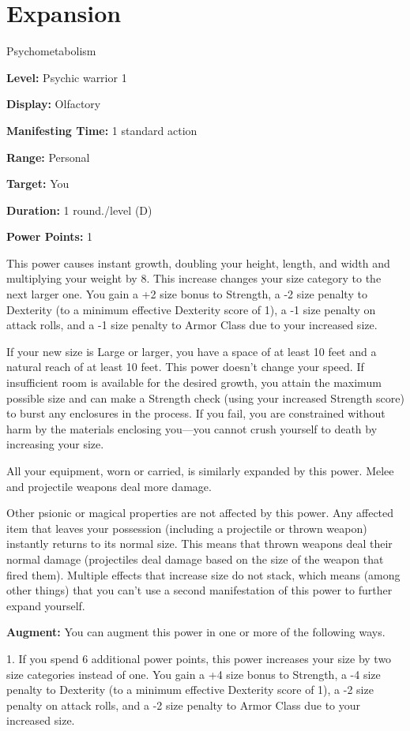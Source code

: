 \documentclass{article}
\begin{document}
\section*{Expansion}

Psychometabolism

\textbf{Level:} Psychic warrior 1

\textbf{Display:} Olfactory

\textbf{Manifesting Time:} 1 standard action

\textbf{Range:} Personal

\textbf{Target:} You

\textbf{Duration:} 1 round./level (D)

\textbf{Power Points:} 1

This power causes instant growth, doubling your height, length, and width and multiplying 
your weight by 8. This increase changes your size category to the next larger one. 
You gain a +2 size bonus to Strength, a -2 size penalty to Dexterity (to a minimum 
effective Dexterity score of 1), a -1 size penalty on attack rolls, and a -1 size 
penalty to Armor Class due to your increased size.

If your new size is Large or larger, you have a space of at least 10 feet and a 
natural reach of at least 10 feet. This power doesn't change your speed. If insufficient 
room is available for the desired growth, you attain the maximum possible size 
and can make a Strength check (using your increased Strength score) to burst any 
enclosures in the process. If you fail, you are constrained without harm by the 
materials enclosing you---you cannot crush yourself to death by increasing your 
size.

All your equipment, worn or carried, is similarly expanded by this power. Melee 
and projectile weapons deal more damage.

Other psionic or magical properties are not affected by this power. Any affected 
item that leaves your possession (including a projectile or thrown weapon) instantly 
returns to its normal size. This means that thrown weapons deal their normal damage 
(projectiles deal damage based on the size of the weapon that fired them). Multiple 
effects that increase size do not stack, which means (among other things) that 
you can't use a second manifestation of this power to further expand yourself.

\textbf{Augment:} You can augment this power in one or more of the following ways.

1. If you spend 6 additional power points, this power increases your size by two 
size categories instead of one. You gain a +4 size bonus to Strength, a -4 size 
penalty to Dexterity (to a minimum effective Dexterity score of 1), a -2 size penalty 
on attack rolls, and a -2 size penalty to Armor Class due to your increased size.
\end{document}
